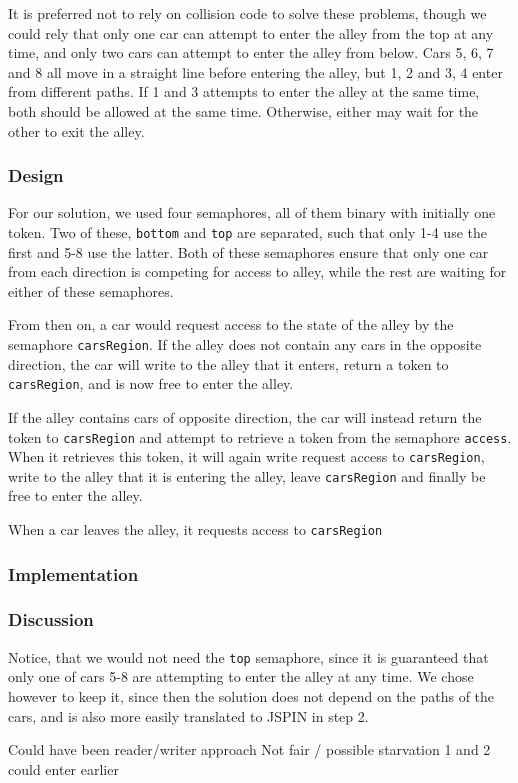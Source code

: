 It is preferred not to rely on collision code to solve these problems, though we could rely that only one car can attempt to enter the alley from the top at any time, and only two cars can attempt to enter the alley from below. Cars 5, 6, 7 and 8 all move in a straight line before entering the alley, but 1, 2 and 3, 4 enter from different paths. If 1 and 3 attempts to enter the alley at the same time, both should be allowed at the same time. Otherwise, either may wait for the other to exit the alley.

\subsubsection*{Design}
For our solution, we used four semaphores, all of them binary with initially one token. Two of these, \texttt{bottom} and \texttt{top} are separated, such that only 1-4 use the first and 5-8 use the latter. Both of these semaphores ensure that only one car from each direction is competing for access to alley, while the rest are waiting for either of these semaphores.

From then on, a car would request access to the state of the alley by the semaphore \texttt{carsRegion}. If the alley does not contain any cars in the opposite direction, the car will write to the alley that it enters, return a token to \texttt{carsRegion}, and is now free to enter the alley.

If the alley contains cars of opposite direction, the car will instead return the token to \texttt{carsRegion} and attempt to retrieve a token from the semaphore \texttt{access}. When it retrieves this token, it will again write request access to \texttt{carsRegion}, write to the alley that it is entering the alley, leave \texttt{carsRegion} and finally be free to enter the alley.

When a car leaves the alley, it requests access to \texttt{carsRegion} 

\subsubsection*{Implementation}

\subsubsection*{Discussion}

Notice, that we would not need the \texttt{top} semaphore, since it is guaranteed that only one of cars 5-8 are attempting to enter the alley at any time. We chose however to keep it, since then the solution does not depend on the paths of the cars, and is also more easily translated to JSPIN in step 2.

Could have been reader/writer approach
Not fair / possible starvation
1 and 2 could enter earlier